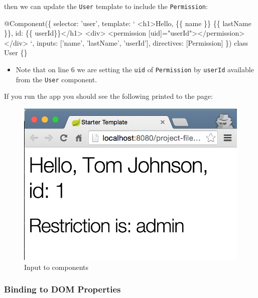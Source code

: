 \documentclass[12pt,]{article}
\newenvironment{Shaded}{}{}
\newcommand{\KeywordTok}[1]{\textcolor[rgb]{0.00,0.00,1.00}{{#1}}}
\newcommand{\StringTok}[1]{\textcolor[rgb]{0.00,0.50,0.50}{{#1}}}
\newcommand{\FunctionTok}[1]{{#1}}
\newcommand{\NormalTok}[1]{{#1}}
\providecommand{\tightlist}{%
  \setlength{\itemsep}{0pt}\setlength{\parskip}{0pt}}
\begin{document}
then we can update the \texttt{User} template to include the
\texttt{Permission}:

\begin{Shaded}
\begin{Highlighting}[numbers=left,,]
\FunctionTok{@Component}\NormalTok{(\{}
  \NormalTok{selector: 'user',}
  \NormalTok{template: `}
  \NormalTok{<h1>Hello, \{\{ name \}\} \{\{ lastName \}\}, id: \{\{ userId\}\}</h1>}
  \NormalTok{<div>}
    \NormalTok{<permission [uid]=}\StringTok{"userId"}\NormalTok{></permission>}
  \NormalTok{</div>}
  \NormalTok{`,}
  \NormalTok{inputs: ['name', 'lastName', 'userId'],}
  \NormalTok{directives: [Permission]}
\NormalTok{\})}
\KeywordTok{class} \NormalTok{User \{\}}
\end{Highlighting}
\end{Shaded}

\begin{itemize}
\tightlist
\item
  Note that on line 6 we are setting the \texttt{uid} of
  \texttt{Permission} by \texttt{userId} available from the
  \texttt{User} component.
\end{itemize}

If you run the app you should see the following printed to the page:

\begin{figure}[htbp]
\centering
\includegraphics{images/input-cmp.png}
\caption{Input to components}
\end{figure}

\subsubsection{Binding to DOM
Properties}\label{binding-to-dom-properties}
\end{document}

